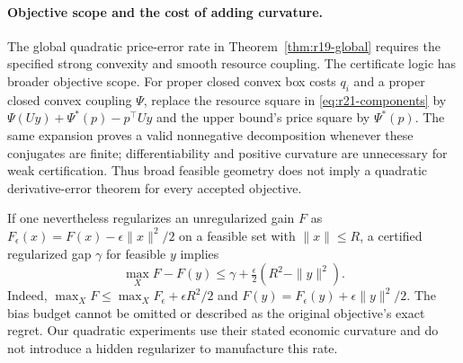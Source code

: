 \paragraph{Objective scope and the cost of adding curvature.}
The global quadratic price-error rate in Theorem~\ref{thm:r19-global} requires the specified strong convexity and smooth resource coupling. The certificate logic has broader objective scope. For proper closed convex box costs $q_i$ and a proper closed convex coupling $\Psi$, replace the resource square in \eqref{eq:r21-components} by
$\Psi(Uy)+\Psi^*(p)-p^\top Uy$ and the upper bound's price square by $\Psi^*(p)$. The same expansion proves a valid nonnegative decomposition whenever these conjugates are finite; differentiability and positive curvature are unnecessary for weak certification. Thus broad feasible geometry does not imply a quadratic derivative-error theorem for every accepted objective.

If one nevertheless regularizes an unregularized gain $F$ as
$F_\epsilon(x)=F(x)-\epsilon\|x\|^2/2$ on a feasible set with $\|x\|\leq R$, a certified regularized gap $\gamma$ for feasible $y$ implies
\begin{equation}\label{eq:r21-regularization}
 \max_XF-F(y)\leq\gamma+\tfrac\epsilon2(R^2-\|y\|^2).
\end{equation}
Indeed, $\max_XF\leq\max_XF_\epsilon+\epsilon R^2/2$ and
$F(y)=F_\epsilon(y)+\epsilon\|y\|^2/2$. The bias budget cannot be omitted or described as the original objective's exact regret. Our quadratic experiments use their stated economic curvature and do not introduce a hidden regularizer to manufacture this rate.
